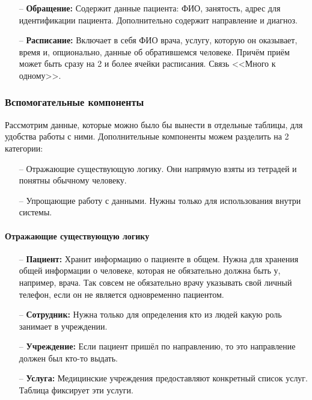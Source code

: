 \documentclass[a4paper,article]{article}
\begin{document}
\begin{sloppypar}
    \begin{itemize}[nolistsep]
        \item[--] \textbf{Обращение:} Содержит данные пациента: ФИО, занятость, адрес для идентификации пациента. Дополнительно содержит направление и диагноз.
        \item[--] \textbf{Расписание:} Включает в себя ФИО врача, услугу, которую он оказывает, время и, опционально, данные об обратившемся человеке. Причём приём может быть сразу на 2 и более ячейки расписания. Связь <<Много к одному>>.
    \end{itemize}

    \subsubsection{Вспомогательные компоненты}\label{Проектирование БД. Вспомогательные компоненты}

    Рассмотрим данные, которые можно было бы вынести в отдельные таблицы, для удобства работы с ними. Дополнительные компоненты можем разделить на 2 категории:

    \begin{itemize}[nolistsep]
        \item[--] Отражающие существующую логику. Они напрямую взяты из тетрадей и понятны обычному человеку.
        \item[--] Упрощающие работу с данными. Нужны только для использования внутри системы.
    \end{itemize}

    \paragraph{Отражающие существующую логику}\label{Проектирование БД. Вспомогательные компоненты. Отражающие логику}

    \begin{itemize}[nolistsep]
        \item[--] \textbf{Пациент:} Хранит информацию о пациенте в общем. Нужна для хранения общей информации о человеке, которая не обязательно должна быть у, например, врача. Так совсем не обязательно врачу указывать свой личный телефон, если он не является одновременно пациентом.
        \item[--] \textbf{Сотрудник:} Нужна только для определения кто из людей какую роль занимает в учреждении.
        \item[--] \textbf{Учреждение:} Если пациент пришёл по направлению, то это направление должен был кто-то выдать.
        \item[--] \textbf{Услуга:} Медицинские учреждения предоставляют конкретный список услуг. Таблица фиксирует эти услуги.
    \end{itemize}


\end{sloppypar}
\end{document}
